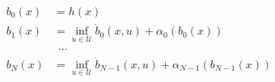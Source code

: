 \documentclass[preview]{standalone}
\begin{document}
\begin{align*}
b_0(x) &= h(x)\\ b_1(x) &= \inf_{u \in \mathcal{U}} \dot b_0(x, u) + \alpha_0 (b_0(x))\\ &\ \ \cdots\\ b_N(x) &= \inf_{u \in \mathcal{U}} \dot b_{N-1}(x, u) + \alpha_{N-1} (b_{N-1}(x))
\end{align*}
\end{document}
